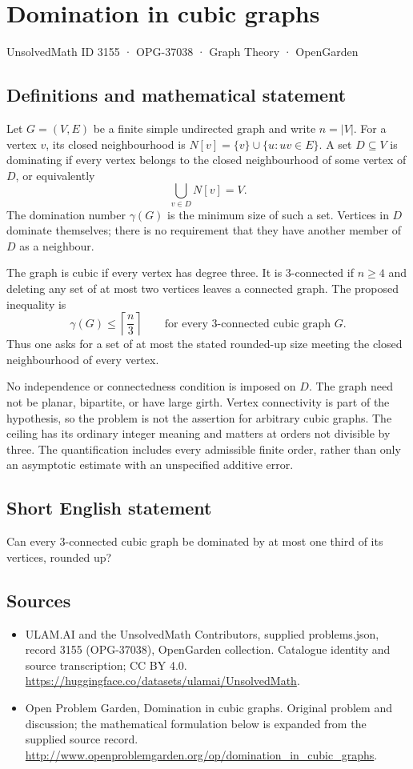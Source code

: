\documentclass[11pt,a4paper]{article}
\begin{document}
\section*{Domination in cubic graphs}\label{3155}
{\small UnsolvedMath ID 3155 · OPG-37038 · Graph Theory · OpenGarden}
\subsection{Definitions and mathematical statement}
Let $G=(V,E)$ be a finite simple undirected graph and write
$n=|V|$. For a vertex $v$, its closed neighbourhood is
$N[v]=\{v\}\cup\{u:uv\in E\}$. A set $D\subseteq V$ is dominating
if every vertex belongs to the closed neighbourhood of some vertex
of $D$, or equivalently
\[
 \bigcup_{v\in D}N[v]=V.
\]
The domination number $\gamma(G)$ is the minimum size of such a
set. Vertices in $D$ dominate themselves; there is no requirement
that they have another member of $D$ as a neighbour.

The graph is cubic if every vertex has degree three. It is
$3$-connected if $n\geq4$ and deleting any set of at most two
vertices leaves a connected graph. The proposed inequality is
\[
 \gamma(G)\leq\left\lceil\frac n3\right\rceil
 \qquad\text{for every $3$-connected cubic graph }G.
\]
Thus one asks for a set of at most the stated rounded-up size
meeting the closed neighbourhood of every vertex.

No independence or connectedness condition is imposed on $D$.
The graph need not be planar, bipartite, or have large girth.
Vertex connectivity is part of the hypothesis, so the problem
is not the assertion for arbitrary cubic graphs. The ceiling
has its ordinary integer meaning and matters at orders not
divisible by three. The quantification includes every admissible
finite order, rather than only an asymptotic estimate with an
unspecified additive error.
\subsection{Short English statement}
Can every 3-connected cubic graph be dominated by at most one third of its vertices, rounded up?
\subsection{Sources}
\begin{itemize}
\item[S1] ULAM.AI and the UnsolvedMath Contributors, supplied problems.json, record 3155 (OPG-37038), OpenGarden collection. Catalogue identity and source transcription; CC BY 4.0.
\url{https://huggingface.co/datasets/ulamai/UnsolvedMath}.
\item[S2] Open Problem Garden, Domination in cubic graphs. Original problem and discussion; the mathematical formulation below is expanded from the supplied source record.
\url{http://www.openproblemgarden.org/op/domination_in_cubic_graphs}.
\end{itemize}
\end{document}
